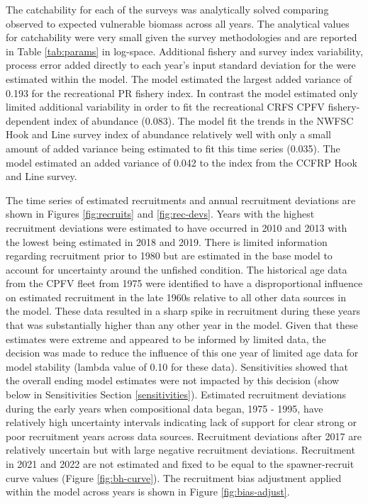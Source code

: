 \documentclass[11pt,
  english,
  letterpaper,
]{article}
\begin{document}
The catchability for each of the surveys was analytically solved comparing observed to expected vulnerable biomass across all years. The analytical values for catchability were very small given the survey methodologies and are reported in Table \ref{tab:params} in log-space. Additional fishery and survey index variability, process error added directly to each year's input standard deviation for the were estimated within the model. The model estimated the largest added variance of 0.193 for the recreational PR fishery index. In contrast the model estimated only limited additional variability in order to fit the recreational CRFS CPFV fishery-dependent index of abundance (0.083). The model fit the trends in the NWFSC Hook and Line survey index of abundance relatively well with only a small amount of added variance being estimated to fit this time series (0.035). The model estimated an added variance of 0.042 to the index from the CCFRP Hook and Line survey.

The time series of estimated recruitments and annual recruitment deviations are shown in Figures \ref{fig:recruits} and \ref{fig:rec-devs}. Years with the highest recruitment deviations were estimated to have occurred in 2010 and 2013 with the lowest being estimated in 2018 and 2019. There is limited information regarding recruitment prior to 1980 but are estimated in the base model to account for uncertainty around the unfished condition. The historical age data from the CPFV fleet from 1975 were identified to have a disproportional influence on estimated recruitment in the late 1960s relative to all other data sources in the model. These data resulted in a sharp spike in recruitment during these years that was substantially higher than any other year in the model. Given that these estimates were extreme and appeared to be informed by limited data, the decision was made to reduce the influence of this one year of limited age data for model stability (lambda value of 0.10 for these data). Sensitivities showed that the overall ending model estimates were not impacted by this decision (show below in Sensitivities Section \ref{sensitivities}). Estimated recruitment deviations during the early years when compositional data began, 1975 - 1995, have relatively high uncertainty intervals indicating lack of support for clear strong or poor recruitment years across data sources. Recruitment deviations after 2017 are relatively uncertain but with large negative recruitment deviations. Recruitment in 2021 and 2022 are not estimated and fixed to be equal to the spawner-recruit curve values (Figure \ref{fig:bh-curve}). The recruitment bias adjustment applied within the model across years is shown in Figure \ref{fig:bias-adjust}.
\end{document}
